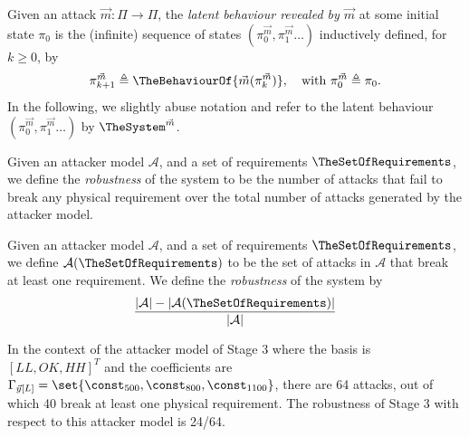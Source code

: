 {\begin{definition}
  \label{def:LatentBehaviour}
  Given an attack $\vec{m}\colon \Pi\rightarrow \Pi$, the \emph{latent behaviour revealed by $\vec{m}$} at some initial state $\pi_0$ is the (infinite) sequence of states $(\pi^{\vec{m}}_0, \pi^{\vec{m}}_1\ldots)$ inductively defined, for $k\geq 0$, by 
  \begin{align}
    \label{eq:newkCycle}
    {\pi}^{\vec{m}}_{k+1}\triangleq \TheBehaviourOf{\vec{m}({\pi}^{\vec{m}}_{k})}, \quad \text{with ${\pi^{\vec{m}}_{0}}\triangleq \pi_0$.}
  \end{align}
In the following, we slightly abuse notation and refer to the latent behaviour $(\pi^{\vec{m}}_0, \pi^{\vec{m}}_1\ldots)$ by $\TheSystem^{\vec{m}}$.
\end{definition}
Given an attacker model $\mathcal{A}$, and a set of requirements $\TheSetOfRequirements$, we define the \emph{robustness} of the system to be the number of attacks that fail to break any physical requirement over the total number of attacks generated by the attacker model.

\begin{definition}[Robustness]
  Given an attacker model $\mathcal{A}$, and a set of requirements $\TheSetOfRequirements$, we define $\mathcal{A}(\TheSetOfRequirements)$ to be the set of attacks in $\mathcal{A}$ that break at least one requirement. We define 
  the \emph{robustness} of the system by 
  \begin{align*}
    \frac{|\mathcal{A}|-|\mathcal{A}(\TheSetOfRequirements)|}{|\mathcal{A}|}
  \end{align*}
\end{definition}

\begin{example}
  In the context of the attacker model of Stage 3 where the basis is $[LL, OK, HH]^T$ and the coefficients are $\Gamma_{\vec{y}[L]}=\set{\const_{500}, \const_{800},  \const_{1100}}$, there are 64 attacks, out of which 40 break at least one physical requirement. The robustness of Stage 3 with respect to this attacker model is 24/64.
\end{example}
}
